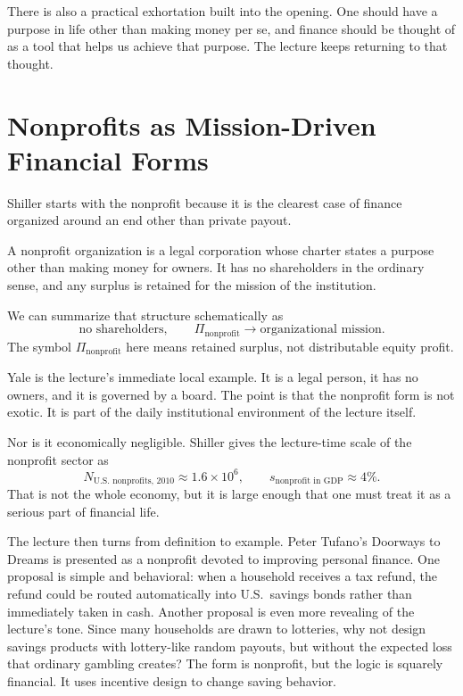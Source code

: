 There is also a practical exhortation built into the opening. One should have a purpose in life other than making money per se, and finance should be thought of as a tool that helps us achieve that purpose. The lecture keeps returning to that thought.

\section{Nonprofits as Mission-Driven Financial Forms}

Shiller starts with the nonprofit because it is the clearest case of finance organized around an end other than private payout.

\begin{definition}
A nonprofit organization is a legal corporation whose charter states a purpose other than making money for owners. It has no shareholders in the ordinary sense, and any surplus is retained for the mission of the institution.
\end{definition}

We can summarize that structure schematically as
\begin{equation}
\text{no shareholders},\qquad \Pi_{\text{nonprofit}} \longrightarrow \text{organizational mission}.
\end{equation}
The symbol \(\Pi_{\text{nonprofit}}\) here means retained surplus, not distributable equity profit.

Yale is the lecture's immediate local example. It is a legal person, it has no owners, and it is governed by a board. The point is that the nonprofit form is not exotic. It is part of the daily institutional environment of the lecture itself.

Nor is it economically negligible. Shiller gives the lecture-time scale of the nonprofit sector as
\begin{equation}
N_{\text{U.S. nonprofits, 2010}} \approx 1.6\times 10^6,
\qquad
s_{\text{nonprofit in GDP}} \approx 4\%.
\end{equation}
That is not the whole economy, but it is large enough that one must treat it as a serious part of financial life.

The lecture then turns from definition to example. Peter Tufano's Doorways to Dreams is presented as a nonprofit devoted to improving personal finance. One proposal is simple and behavioral: when a household receives a tax refund, the refund could be routed automatically into U.S.\ savings bonds rather than immediately taken in cash. Another proposal is even more revealing of the lecture's tone. Since many households are drawn to lotteries, why not design savings products with lottery-like random payouts, but without the expected loss that ordinary gambling creates? The form is nonprofit, but the logic is squarely financial. It uses incentive design to change saving behavior.

